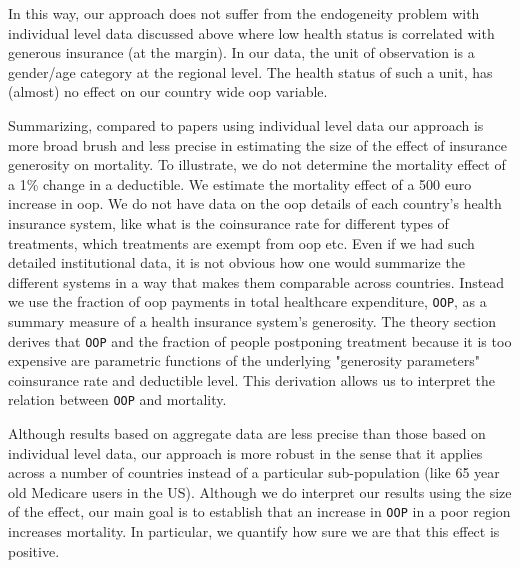 \documentclass[a4paper,12pt]{article}
\begin{document}
In this way, our approach does not suffer from the endogeneity problem with individual level data discussed above where low health status is correlated with generous insurance (at the margin). In our data, the unit of observation is a gender/age category at the regional level. The health status of such a unit, has (almost) no effect on our country wide oop variable.

Summarizing, compared to papers using individual level data our approach is more broad brush and less precise in estimating the size of the effect of insurance generosity on mortality. To illustrate, we do not determine the mortality effect of a 1\% change in a deductible. We estimate the mortality effect of a 500 euro increase in oop. We do not have data on the oop details of each country's health insurance system, like what is the coinsurance rate for different types of treatments, which treatments are exempt from oop etc. Even if we had such detailed institutional data, it is not obvious how one would summarize the different systems in a way that makes them comparable across countries. Instead we use the fraction of oop payments in total healthcare expenditure, \texttt{OOP}, as a summary measure of a health insurance system's generosity. The theory section derives that \texttt{OOP} and the fraction of people postponing treatment because it is too expensive are parametric functions of the underlying "generosity parameters" coinsurance rate and deductible level. This derivation allows us to interpret the relation between \texttt{OOP} and mortality.

Although results based on aggregate data are less precise than those based on individual level data, our approach is more robust in the sense that it applies across a number of countries instead of a particular sub-population (like 65 year old Medicare users in the US). Although we do interpret our results using the size of the effect, our main goal is to establish that an increase in \texttt{OOP} in a poor region increases mortality. In particular, we quantify how sure we are that this effect is positive.
\end{document}
